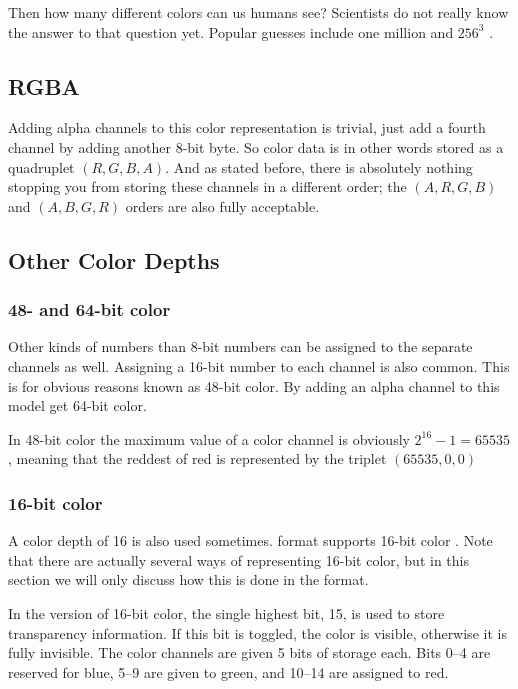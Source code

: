 Then how many different colors can us humans see? Scientists do not
really know the answer to that question yet. Popular guesses include
one million \cite{roth:_tetrachromat} and $256^3$
\cite{murray1996encyclopedia}.

\subsection{RGBA}

Adding alpha channels to this color representation is trivial, just
add a fourth channel by adding another 8-bit byte. So \rgba color data
is in other words stored as a quadruplet $(R,G,B,A)$. And as stated
before, there is absolutely nothing stopping you from storing these
channels in a different order; the $(A,R,G,B)$ and $(A,B,G,R)$ orders
are also fully acceptable.


\subsection{Other Color Depths}
\label{sec:other-channel-sizes}

\subsubsection{48- and 64-bit color}

Other kinds of numbers than 8-bit numbers can be assigned to the
separate channels as well. Assigning a 16-bit number to each channel
is also common. This is for obvious reasons known as 48-bit color. By
adding an alpha channel to this model get 64-bit color.

In 48-bit color the maximum value of a color channel is obviously
$2^{16} - 1 = 65535$, meaning that the reddest of red is represented
by the triplet $(65535, 0, 0)$

\subsubsection{16-bit color}

A color depth of 16 is also used sometimes. \tga format supports 16-bit
color \cite{91:_truev_tga_file_format_specif}. Note that there are
actually several ways of representing 16-bit color, but in this
section we will only discuss how this is done in the \tga format.

In the \tga version of 16-bit color, the single highest bit, 15, is
used to store transparency information. If this bit is toggled, the
color is visible, otherwise it is fully invisible. The \rgb color
channels are given 5 bits of storage each. Bits 0--4 are reserved for
blue, 5--9 are given to green, and 10--14 are assigned to red.

